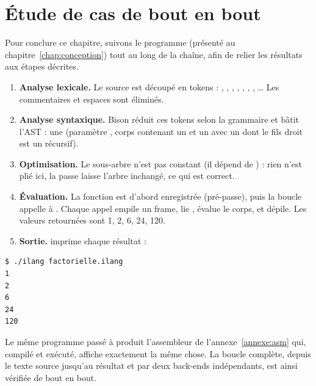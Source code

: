 \section{Étude de cas de bout en bout}

Pour conclure ce chapitre, suivons le programme  (présenté au
chapitre~\ref{chap:conception}) tout au long de la chaîne, afin de relier les
résultats aux étapes décrites.

\begin{enumerate}
  \item \textbf{Analyse lexicale.} Le source est découpé en tokens :
        , , ,
        , , , , \dots{} Les
        commentaires et espaces sont éliminés.
  \item \textbf{Analyse syntaxique.} Bison réduit ces tokens selon la grammaire et
        bâtit l'AST : une  (paramètre , corps
        contenant un  et un  avec un
         \code{*} dont le fils droit est un
         récursif).
  \item \textbf{Optimisation.} Le sous-arbre  n'est pas constant (il
        dépend de ) : rien n'est plié ici, la passe laisse l'arbre
        inchangé, ce qui est correct.
  \item \textbf{Évaluation.} La fonction est d'abord enregistrée (pré-passe), puis
        la boucle  appelle  à
        . Chaque appel empile un frame, lie , évalue
        le corps, et dépile. Les valeurs retournées sont 1, 2, 6, 24, 120.
  \item \textbf{Sortie.}  imprime chaque résultat :
\end{enumerate}

\begin{lstlisting}[style=gram]
$ ./ilang factorielle.ilang
1
2
6
24
120
\end{lstlisting}

\noindent Le même programme passé à  produit l'assembleur de
l'annexe~\ref{annexe:asm} qui, compilé et exécuté, affiche exactement la même
chose. La boucle complète, depuis le texte source jusqu'au résultat et par deux
back-ends indépendants, est ainsi vérifiée de bout en bout.

